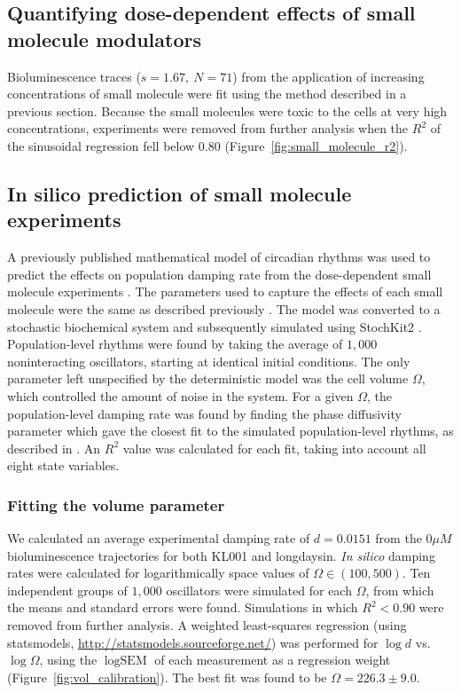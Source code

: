 \documentclass[11pt, letterpaper]{article}
\begin{document}
\subsection*{Quantifying dose-dependent effects of small molecule modulators}
Bioluminescence traces ($s = 1.67,\ N=71$) from the application of increasing concentrations of small molecule were fit using the method described in a previous section.
Because the small molecules were toxic to the cells at very high concentrations, experiments were removed from further analysis when the $R^2$ of the sinusoidal regression fell below $0.80$ (Figure~\ref{fig:small_molecule_r2}).

\subsection*{{In silico} prediction of small molecule experiments}
A previously published mathematical model of circadian rhythms was used to predict the effects on population damping rate from the dose-dependent small molecule experiments \cite{Hirota2012}.
The parameters used to capture the effects of each small molecule were the same as described previously \cite{St.John2014}.
The model was converted to a stochastic biochemical system and subsequently simulated using StochKit2 \cite{Sanft2011a}.
Population-level rhythms were found by taking the average of $1,000$ noninteracting oscillators, starting at identical initial conditions.
The only parameter left unspecified by the deterministic model was the cell volume $\Omega$, which controlled the amount of noise in the system.
For a given $\Omega$, the population-level damping rate was found by finding the phase diffusivity parameter which gave the closest fit to the simulated population-level rhythms, as described in \cite{St.John2014a}.
An $R^2$ value was calculated for each fit, taking into account all eight state variables.

\subsubsection*{Fitting the volume parameter}
We calculated an average experimental damping rate of $d = 0.0151$ from the $0 \mu M$ bioluminescence trajectories for both KL001 and longdaysin.
{\itshape In silico} damping rates were calculated for logarithmically space values of $\Omega \in (100, 500)$.
Ten independent groups of $1,000$ oscillators were simulated for each $\Omega$, from which the means and standard errors were found.
Simulations in which $R^2 < 0.90$ were removed from further analysis.
A weighted least-squares regression (using statsmodels, \url{http://statsmodels.sourceforge.net/}) was performed for $\log d$ vs.\ $\log \Omega$, using the $\log \text{SEM}$ of each measurement as a regression weight (Figure~\ref{fig:vol_calibration}).
The best fit was found to be $\Omega = 226.3 \pm 9.0$.
\end{document}
